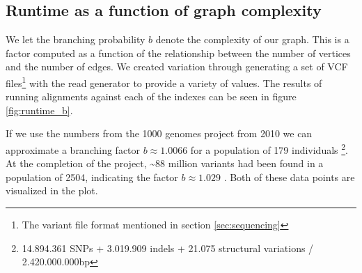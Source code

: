 \documentclass[thesis.tex]{subfiles}
\begin{document}
\subsection*{Runtime as a function of graph complexity}
\label{sec:runtime_complexity}
We let the branching probability $b$ denote the complexity of our graph. This is a factor computed as a function of the relationship between the number of vertices and the number of edges. We created variation through generating a set of VCF files\footnote{The variant file format mentioned in section \ref{sec:sequencing} } with the read generator to provide a variety of values. The results of running alignments against each of the indexes can be seen in figure \ref{fig:runtime_b}.\\
\par\noindent
If we use the numbers from the 1000 genomes project from 2010 \cite{a_map_of_human_genome_variation_from_population_scale_sequencing} we can approximate a branching factor $b\approx1.0066$ for a population of 179 individuals \footnote{14.894.361 SNPs + 3.019.909 indels +  21.075 structural variations / 2.420.000.000bp}. At the completion of the project, \textasciitilde88 million variants had been found in a population of 2504, indicating the factor $b\approx1.029$ \cite{1000_genomes_global_ref}. Both of these data points are visualized in the plot.
\end{document}
